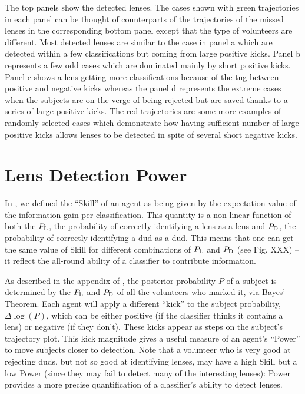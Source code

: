 \documentclass[useAMS,usenatbib,a4paper]{mn2e}
\begin{document}
The top panels show the detected lenses. The cases shown with green trajectories
in each panel can be thought of counterparts of the trajectories of the missed
lenses in the corresponding bottom panel except that the type of volunteers are
different. Most detected lenses are similar to the case in panel a which are
detected within a few classifications but coming from large positive kicks.
Panel b represents a few odd cases which are dominated mainly by short positive
kicks. Panel c shows a lens getting more classifications because of the tug
between positive and negative kicks whereas the panel d represents the extreme
cases when the subjects are on the verge of being rejected but are saved thanks
to a series of large positive kicks. The red trajectories are some more
examples of randomly selected cases which demonstrate how having sufficient
number of large positive kicks allows lenses to be detected in spite of several
short negative kicks.

\section{Lens Detection Power}
\label{appendix:power}

In \PaperOne, we defined the ``Skill'' of an agent as being given by the
expectation value of the information gain per classification. This quantity is a
non-linear function of both the $P_{\rm L}$, the probability of correctly
identifying a lens as a lens and $P_{\rm D}$, the probability of correctly
identifying a dud as a dud. This means that one can get the same value of Skill
for different combinations of $P_{\rm L}$ and $P_{\rm D}$ (see Fig. XXX) -- it
reflect the all-round ability of a classifier to contribute information.

As described in the appendix of \PaperOne, the posterior probability $P$ of a
subject is determined by the $P_{\rm L}$ and $P_{\rm D}$ of all the volunteers
who marked it, via Bayes' Theorem. Each agent will apply a different ``kick'' to
the subject probability, $\Delta\log(P)$, which can be either positive (if the
classifier thinks it contains a lens) or negative (if they don't). These kicks
appear as steps on the subject's trajectory plot. This kick magnitude gives a useful measure of an agent's ``Power'' to move subjects closer to detection.
Note that a volunteer who is very good at rejecting duds, but not so good
at identifying lenses, may have a high Skill but a low Power (since they may fail to detect many of the interesting lenses): Power provides a more precise quantification of a classifier's ability to detect lenses.
\end{document}
